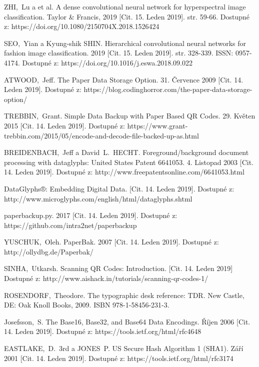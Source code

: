 \documentclass[conference]{IEEEtran}
\begin{document}
\begin{thebibliography}{1}
ZHI,~Lu a et al. A dense convolutional neural network for hyperspectral image classification. Taylor \& Francis, 2019 [Cit. 15. Leden 2019]. str. 59-66. Dostupné z: https://doi.org/10.1080/2150704X.2018.1526424 

SEO,~Yian a Kyung-shik SHIN. Hierarchical convolutional neural networks for fashion image classification. 2019 [Cit. 15. Leden 2019]. str. 328-339. ISSN: 0957-4174. Dostupné z: https://doi.org/10.1016/j.eswa.2018.09.022

ATWOOD,~Jeff. The Paper Data Storage Option. 31. Července 2009 [Cit. 14. Leden 2019]. Dostupné z: https://blog.codinghorror.com/the-paper-data-storage-option/

TREBBIN,~Grant. Simple Data Backup with Paper Based QR Codes. 29. Květen 2015 [Cit. 14. Leden 2019]. Dostupné z: https://www.grant-trebbin.com/2015/05/encode-and-decode-file-backed-up-as.html  
	
BREIDENBACH,~Jeff a David~L.~HECHT. Foreground/background document processing with dataglyphs: United States Patent 6641053. 4. Listopad 2003 [Cit. 14. Leden 2019]. Dostupné z: http://www.freepatentsonline.com/6641053.html

DataGlyphs®: Embedding Digital Data. [Cit. 14. Leden 2019]. Dostupné z: http://www.microglyphs.com/english/html/dataglyphs.shtml
	
paperbackup.py. 2017 [Cit. 14. Leden 2019]. Dostupné z: https://github.com/intra2net/paperbackup
  
YUSCHUK,~Oleh. PaperBak. 2007 [Cit. 14. Leden 2019]. Dostupné z: http://ollydbg.de/Paperbak/

SINHA,~Utkarsh. Scanning QR Codes: Introduction. [Cit. 14. Leden 2019] Dostupné z: http://www.aishack.in/tutorials/scanning-qr-codes-1/
  
ROSENDORF,~Theodore. The typographic desk reference: TDR. New Castle, DE: Oak Knoll Books, 2009. ISBN 978-1-58456-231-3.

Josefsson,~S. The Base16, Base32, and Base64 Data Encodings. Říjen 2006 [Cit. 14. Leden 2019]. Dostupné z: https://tools.ietf.org/html/rfc4648

EASTLAKE,~D.~3rd a JONES~P. US Secure Hash Algorithm 1 (SHA1). Září 2001 [Cit. 14. Leden 2019]. Dostupné z: https://tools.ietf.org/html/rfc3174


\end{thebibliography}
\end{document}
